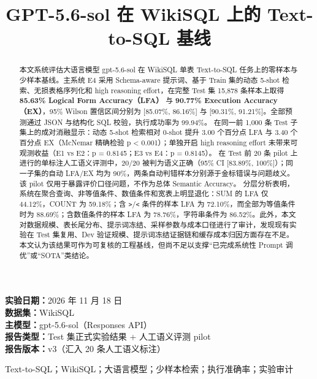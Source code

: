 \documentclass[conference]{IEEEtran}
\begin{document}
\title{GPT-5.6-sol 在 WikiSQL 上的 Text-to-SQL 基线}
\author{}
\maketitle
\begin{center}\small
\textbf{实验日期：}2026 年 11 月 18 日\\
\textbf{数据集：}WikiSQL\\
\textbf{主模型：}gpt-5.6-sol（Responses API）\\
\textbf{报告类型：}Test 集正式实验结果 + 人工语义评测 pilot\\
\textbf{报告版本：}v3（汇入 20 条人工语义标注）
\end{center}
\vspace{2mm}
\begin{abstract}
本文系统评估大语言模型 gpt-5.6-sol 在 WikiSQL 单表 Text-to-SQL 任务上的零样本与少样本基线。主系统 E4 采用 Schema-aware 提示词、基于 Train 集的动态 5-shot 检索、无损表格序列化和 high reasoning effort，在完整 Test 集 15,878 条样本上取得 \textbf{85.63\% Logical Form Accuracy（LFA）} 与 \textbf{90.77\% Execution Accuracy（EX）}，95\% Wilson 置信区间分别为 [85.07\%, 86.16\%] 与 [90.31\%, 91.21\%]。全部预测通过 JSON 与结构化 SQL 校验，执行成功率为 99.94\%。
在同一前 1,000 条 Test 子集上的成对消融显示：动态 5-shot 检索相对 0-shot 提升 3.00 个百分点 LFA 与 3.40 个百分点 EX（McNemar 精确检验 p \textless{} 0.001）；单独开启 high reasoning effort 未带来可观测收益（E1 vs E2：p = 0.8145；E3 vs E4：p = 0.8145）。
在 Test 前 20 条 pilot 上进行的单标注人工语义评测中，20/20 被判为语义正确（95\% CI [83.89\%, 100\%]）；同一子集的自动 LFA/EX 均为 90\%，两条自动判错样本分别源于金标错误与问题歧义。该 pilot 仅用于暴露评价口径问题，不作为总体 Semantic Accuracy。
分层分析表明，系统在聚合查询、非等值条件、数值条件和宽表上明显退化：SUM 的 LFA 仅 44.12\%，COUNT 为 59.18\%；含 \texttt{\textgreater{}}/\texttt{\textless{}} 条件的样本 LFA 为 72.10\%，而全部为等值条件时为 88.69\%；含数值条件的样本 LFA 为 78.76\%，字符串条件为 86.52\%。此外，本文对数据规模、表长尾分布、提示词冻结、采样参数与成本口径进行了审计，发现现有实验在 Test 集复用、Dev 验证规模、提示词冻结证据链和缓存成本归因方面存在不足。本文认为该结果可作为可复核的工程基线，但尚不足以支撑“已完成系统性 Prompt 调优”或“SOTA”类结论。
\end{abstract}
\begin{IEEEkeywords}
Text-to-SQL；WikiSQL；大语言模型；少样本检索；执行准确率；实验审计
\end{IEEEkeywords}
\end{document}
